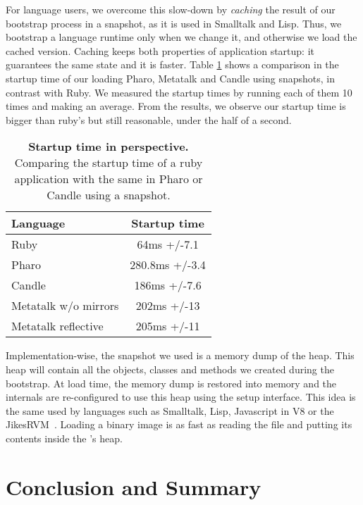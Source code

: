For language users, we overcome this slow-down by \emph{caching} the result of our bootstrap process in a snapshot, as it is used in Smalltalk and Lisp. Thus, we bootstrap a language runtime only when we change it, and otherwise we load the cached version. Caching keeps both properties of application startup: it guarantees the same state and it is faster. Table \ref{tb:startup} shows a comparison in the startup time of our \VM loading Pharo, Metatalk and Candle using snapshots, in contrast with Ruby. We measured the startup times by running each of them 10 times and making an average. From the results, we observe our startup time is bigger than ruby's but still reasonable, under the half of a second.

 \begin{table}[ht]
 \small
 	\centering
 	\begin{tabular}{lc}
			\toprule
			\textbf{Language}
 			& \textbf{Startup time}\\
		\toprule
		Ruby &  64ms +/-7.1\\\midrule
		Pharo & 280.8ms +/-3.4\\\midrule
		Candle & 186ms +/-7.6\\\midrule
		Metatalk w/o mirrors &202ms +/-13\\\midrule
		Metatalk reflective &205ms +/-11\\\bottomrule
 	\end{tabular}
	\vspace*{0.2cm}
 	\caption{\small\textbf{Startup time in perspective.} Comparing the startup time of a ruby application with the same in Pharo or Candle using a snapshot.\label{tb:startup}}
 \end{table}

Implementation-wise, the snapshot we used is a memory dump of the \VM heap. This heap will contain all the objects, classes and methods we created during the bootstrap. At load time, the memory dump is restored into memory and the \VM internals are re-configured to use this heap using the \VM setup interface. This idea is the same used by languages such as Smalltalk, Lisp, Javascript in V8 or the JikesRVM~\cite{Alpe00a}. Loading a binary image is as fast as reading the file and putting its contents inside the \VM's heap.

\section{Conclusion and Summary}

